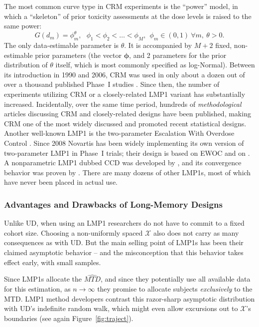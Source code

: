 The most common curve type in CRM experiments is the ``power'' model, in which a ``skeleton'' of prior toxicity assessments at the dose levels is raised to the same power:
\begin{equation}\label{eq:crm0}
G\left(d_m\right)=\phi_m^\theta,\ \ \ \phi_1<\phi_2<\ldots <\phi_M ,\ \ \phi_m\in(0,1) \ \forall m,\ \theta>0.
\end{equation}
The only data-estimable parameter is $\theta$. It is accompanied by $M+2$ fixed, non-estimable prior parameters (the vector $\boldsymbol{\phi}$, and 2 parameters for the prior distribution of $\theta$ itself, which is most commonly specified as log-Normal). Between its introduction in 1990 and 2006, CRM was used in only about a dozen out of over a thousand published Phase~I studies \citep{Rogat:etal:oped:2007}. Since then, the number of experiments utilizing CRM or a closely-related LMP1 variant has substantially increased. Incidentally, over the same time period, hundreds of \emph{methodological} articles discussing CRM and closely-related designs have been published, making CRM one of the most widely discussed and promoted recent statistical designs. Another well-known LMP1 is the two-parameter Escalation With Overdose Control \citep[EWOC][]{Babb:Roga:Roga:Zack:canc:1998}. Since 2008 Novartis has been widely implementing its own version of two-parameter LMP1 in Phase~I trials; their design is based on EWOC and on \cite{Neunsch08}. A nonparametric LMP1 dubbed CCD was developed by \citet{Ivan:Flou:Chun:Cumu:2007}, and its convergence behavior was proven by \cite{oron:azri:hoff:dose:2011}. There are many dozens of other LMP1s, most of which have never been placed in actual use.

\subsubsection{Advantages and Drawbacks of Long-Memory Designs}

Unlike UD, when using an LMP1 researchers do not have to commit to a fixed cohort size. Choosing a non-uniformly spaced $\mathcal{X}$ also does not carry as many consequences as with UD. But the main selling point of LMP1s has been their claimed asymptotic behavior -- and the misconception that this behavior takes effect early, with small samples.

Since LMP1s allocate the $\widehat{MTD}$, and since they potentially use all available data for this estimation, as $n\to\infty$ they promise to allocate subjects \emph{exclusively} to the MTD. LMP1 method developers contrast this razor-sharp asymptotic distribution with UD's indefinite random walk, which might even allow excursions out to $\mathcal{X}$'s boundaries (see again Figure~\ref{fig:traject}).

